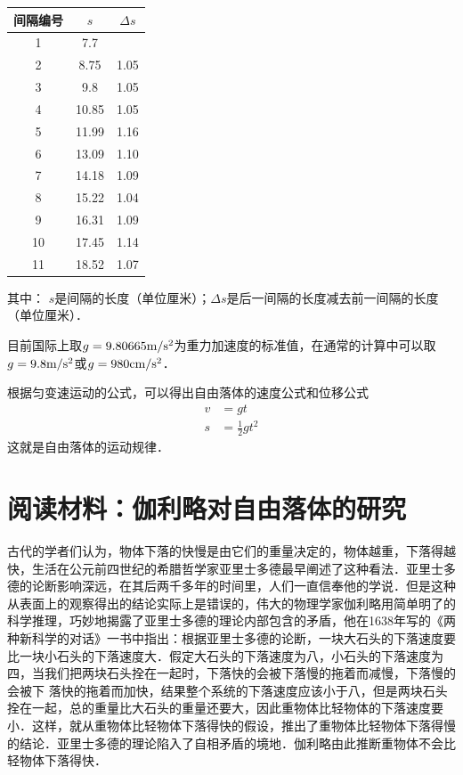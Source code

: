 \begin{center}
\begin{tabular}{ccc}
	\hline
间隔编号&
$s$&$\Delta s$
 \\\hline
	1&	7.7&	\\
	2&	8.75&	1.05
\\
	3&	9.8&	1.05
\\
	4&	10.85&	1.05
\\
	5&	11.99&	1.16
\\
	6&	13.09&	1.10
\\
	7&	14.18&	1.09
\\
	8&	15.22&	1.04
\\
	9&	16.31&	1.09
\\
	10&	17.45&	1.14
\\
	11&	18.52&	1.07\\\hline
\end{tabular}

其中：	$s$是间隔的长度（单位厘米）；$\Delta s$是后一间隔的长度减去前一间隔的长度（单位厘米）．
\end{center}



目前国际上取$g=9.80665\text{m}/\text{s}^2$为重力加速度的标准值，在通常的计算中可以取$g=9.8\text{m}/\text{s}^2$或$g=980{\rm cm/s^2}$．

根据匀变速运动的公式，可以得出自由落体的速度公式和位移公式
\[\begin{split}
v&=gt\\
s&=\frac{1}{2}gt^2
\end{split}\]
这就是自由落体的运动规律．


\section*{阅读材料：伽利略对自由落体的研究}
古代的学者们认为，物体下落的快慢是由它们的重量决定的，物体越重，下落得越快，生活在公元前四世纪的希腊哲学家亚里士多德最早阐述了这种看法．亚里士多德的论断影响深远，在其后两千多年的时间里，人们一直信奉他的学说．但是这种从表面上的观察得出的结论实际上是错误的，伟大的物理学家伽利略用简单明了的科学推理，巧妙地揭露了亚里士多德的理论内部包含的矛盾，他在1638年写的《两种新科学的对话》一书中指出：根据亚里士多德的论断，一块大石头的下落速度要比一块小石头的下落速度大．假定大石头的下落速度为八，小石头的下落速度为四，当我们把两块石头拴在一起时，下落快的会被下落慢的拖着而减慢，下落慢的会被下
落快的拖着而加快，结果整个系统的下落速度应该小于八，但是两块石头拴在一起，总的重量比大石头的重量还要大，因此重物体比轻物体的下落速度要小．这样，就从重物体比轻物体下落得快的假设，推出了重物体比轻物体下落得慢的结论．亚里士多德的理论陷入了自相矛盾的境地．伽利略由此推断重物体不会比轻物体下落得快．

